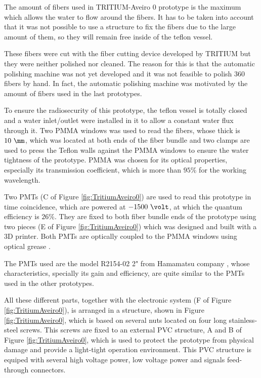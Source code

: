 The amount of fibers used in TRITIUM-Aveiro 0 prototype is the maximum which allows the water to flow around the fibers. It has to be taken into account that it was not possible to use a structure to fix the fibers due to the large amount of them, so they will remain free inside of the teflon vessel. 

These fibers were cut with the fiber cutting device developed by TRITIUM but they were neither polished nor cleaned. The reason for this is that the automatic polishing machine was not yet developed and it was not feasible to polish 360 fibers by hand. In fact, the automatic polishing machine was motivated by the amount of fibers used in the last prototypes.

To ensure the radiosecurity of this prototype, the teflon vessel is totally closed and  a water inlet/outlet were installed in it to allow a constant water flux through it. Two PMMA windows was used to read the fibers, whose thick is $10~\mm$, which was located at both ends of the fiber bundle and two clamps are used to press the Teflon walls against the PMMA windows to ensure the water tightness of the prototype. PMMA was chosen for its optical properties, especially its transmission coefficient, which is more than $95\%$ for the working wavelength.

Two PMTs (C of Figure \ref{fig:TritiumAveiro0}) are used to read this prototype in time coincidence, which are powered at $-1500~\volt$, at which the quantum efficiency is $26\%$. They are fixed to both fiber bundle ends of the prototype using two pieces (E of Figure \ref{fig:TritiumAveiro0}) which was designed and built with a 3D printer. Both PMTs are optically coupled to the PMMA windows using optical grease \cite{OpticalGrease}.

The PMTs used are the model R2154-02 2" from Hamamatsu company \cite{DataSheetPMTsAveiro}, whose characteristics, specially its gain and efficiency, are quite similar to the PMTs used in the other prototypes.

All these different parts, together with the electronic system (F of Figure \ref{fig:TritiumAveiro0}), is arranged in a structure, shown in Figure \ref{fig:TritiumAveiro0}, which is based on several nuts located on four long stainless-steel screws. This screws are fixed to an external PVC structure, A and B of Figure \ref{fig:TritiumAveiro0}, which is used to protect the prototype from physical damage and provide a light-tight operation environment. This PVC structure is equiped with several high voltage power, low voltage power and signals feed-through connectors.

